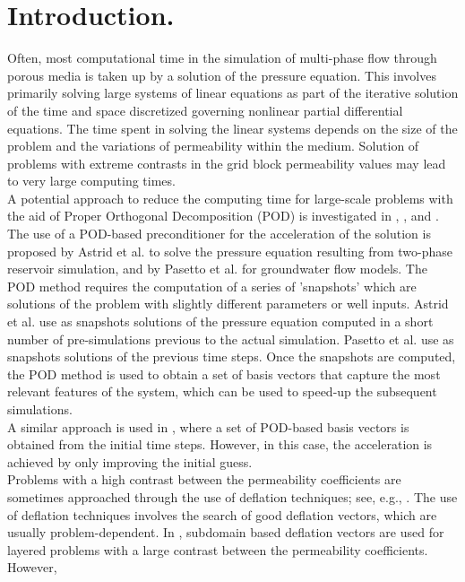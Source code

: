 \documentclass[12pt]{article}
\numberwithin{equation}{section}
\begin{document}
  \section{Introduction.}
  \hspace{0.5cm}Often, most computational time in the simulation of multi-phase flow through porous media is taken 
  up by a
solution of the pressure equation. This involves primarily solving large systems of linear equations as 
part of the iterative solution of the time and space discretized governing nonlinear partial differential 
equations. The time spent in solving the linear systems depends on the size of the problem and the 
variations of permeability within the medium. Solution of problems with extreme contrasts in the grid block 
permeability values may lead to very large computing times.\\
A potential approach to reduce the computing time for large-scale problems with the aid of Proper Orthogonal 
Decomposition (POD) is investigated in \cite{Astrid11}, \cite{Mark06}, \cite{Pasetto16} and \cite{Carlberg15}. 
The use of a POD-based preconditioner for the acceleration of the solution is proposed by Astrid et al. 
\cite{Astrid11} to solve the pressure equation resulting from two-phase reservoir simulation, and by Pasetto 
et al. \cite{Pasetto16} for groundwater flow models. 
The POD method requires the computation of a series of 'snapshots' which are solutions of the problem with slightly 
different parameters or well inputs. Astrid et al. \cite{Astrid11} use as snapshots solutions of the pressure equation computed in a short number of pre-simulations previous to the actual simulation. Pasetto et al. \cite{Pasetto16} use as snapshots solutions of the previous time steps.
Once the snapshots are computed, the POD method is used to obtain a set of basis 
vectors that capture the most relevant features of the system, which can be used to speed-up the subsequent simulations.\\
A similar approach is used in \cite{Mark06}, where a set of POD-based 
basis vectors is obtained from the initial time steps. However, in this case, the acceleration is 
achieved by only improving the initial guess.\\
Problems with a high contrast between the permeability coefficients are sometimes approached through the 
use of deflation techniques; see, e.g., \cite{Vuik99}. The use of deflation techniques involves the search 
of good deflation vectors, which are usually problem-dependent. In \cite{Vuik99}, subdomain based deflation 
vectors are used for layered problems with a large contrast between the permeability coefficients. However, 
\end{document}
